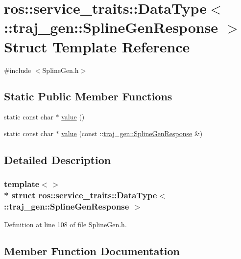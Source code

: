 \hypertarget{structros_1_1service__traits_1_1_data_type_3_01_1_1traj__gen_1_1_spline_gen_response_01_4}{}\section{ros\+:\+:service\+\_\+traits\+:\+:Data\+Type$<$ \+:\+:traj\+\_\+gen\+:\+:Spline\+Gen\+Response $>$ Struct Template Reference}
\label{structros_1_1service__traits_1_1_data_type_3_01_1_1traj__gen_1_1_spline_gen_response_01_4}


{\ttfamily \#include $<$Spline\+Gen.\+h$>$}

\subsection*{Static Public Member Functions}
\begin{DoxyCompactItemize}
\item 
static const char $\ast$ \hyperlink{structros_1_1service__traits_1_1_data_type_3_01_1_1traj__gen_1_1_spline_gen_response_01_4_a0c3631365939cd0761d86402eafb750a}{value} ()
\item 
static const char $\ast$ \hyperlink{structros_1_1service__traits_1_1_data_type_3_01_1_1traj__gen_1_1_spline_gen_response_01_4_a4e1706302b9bc17743ddd940a66a393c}{value} (const \+::\hyperlink{namespacetraj__gen_a96b15a7eb1a4a1209fba2e9d75acb7a4}{traj\+\_\+gen\+::\+Spline\+Gen\+Response} \&)
\end{DoxyCompactItemize}


\subsection{Detailed Description}
\subsubsection*{template$<$$>$\\*
struct ros\+::service\+\_\+traits\+::\+Data\+Type$<$ \+::traj\+\_\+gen\+::\+Spline\+Gen\+Response $>$}



Definition at line 108 of file Spline\+Gen.\+h.



\subsection{Member Function Documentation}
